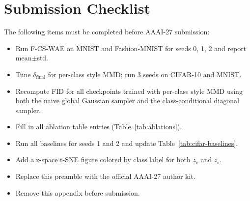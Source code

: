 \documentclass[10pt]{article}
\newcommand{\ours}{F-CS-WAE}
\newcommand{\zc}{z_{\mathrm{c}}}
\newcommand{\zs}{z_{\mathrm{s}}}
\begin{document}
\section{Submission Checklist}
\label{app:checklist}

The following items must be completed before AAAI-27 submission:
\begin{itemize}
  \item Run \ours{} on MNIST and Fashion-MNIST for seeds 0, 1, 2 and report mean$\pm$std.
  \item Tune $\delta_{\mathrm{final}}$ for per-class style MMD; run 3 seeds on CIFAR-10 and MNIST.
  \item Recompute FID for all checkpoints trained with per-class style MMD using
        both the naive global Gaussian sampler and the class-conditional diagonal sampler.
  \item Fill in all ablation table entries (Table~\ref{tab:ablations}).
  \item Run all baselines for seeds 1 and 2 and update Table~\ref{tab:cifar-baselines}.
  \item Add a z-space t-SNE figure colored by class label for both $\zc$ and $\zs$.
  \item Replace this preamble with the official AAAI-27 author kit.
  \item Remove this appendix before submission.
\end{itemize}
\end{document}
